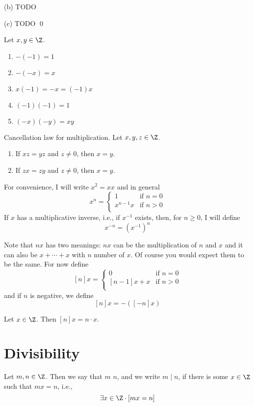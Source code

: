 (b) TODO

(c) TODO
\qed

\begin{prop}
  Let $x, y \in \Z$.
  \begin{enumerate}[nosep,label=\textnormal{(\alph*)}]
  \item $-(-1) = 1$
  \item $-(-x) = x$
  \item $x(-1) = -x = (-1)x$
  \item $(-1)(-1) = 1$
  \item $(-x)(-y) = xy$
  \end{enumerate}
\end{prop}

\begin{prop}
  Cancellation law for multiplication.
  Let $x, y, z \in \Z$.
  \begin{enumerate}[nosep,label=\textnormal{(\alph*)}]
    \item If $xz = yz$ and $z \neq 0$, then $x = y$.
    \item If $zx = zy$ and $z \neq 0$, then $x = y$.
  \end{enumerate}
\end{prop}

For convenience, I will write $x^2 = xx$ and in general
\[
x^n =
\begin{cases}
  1       &\text{if } n = 0 \\
  x^{n-1}x &\text{if } n > 0 \\
\end{cases}
\]
If $x$ has a multiplicative inverse, i.e., if $x^{-1}$ exists,
then, for $n \geq 0$, I will define
\[
x^{-n} = \left( x^{-1} \right)^n
\]

Note that $nx$ has two meanings: $nx$ can be the multiplication of $n$
and $x$ and it can also be $x + \cdots + x$ with $n$ number of $x$.
Of course you would expect them to be the same.
For now define
\[
  [n]x =
  \begin{cases}
    0       &\text{if } n = 0 \\
    [n-1]x + x &\text{if } n > 0 \\
  \end{cases}
\]
and if $n$ is negative, we define
\[
[n]x = -([-n]x)
\]

\begin{prop}
  Let $x \in \Z$.
  Then $[n]x = n \cdot x$.
\end{prop}


\newpage
\section{Divisibility}
\begin{defn}
  Let $m, n \in \Z$.
  Then we say that $m$  $n$, and we write $m \mid n$, if
  there is some $x \in \Z$ such that $mx = n$, i.e.,
  \[
    \exists x \in \Z \cdot [mx = n]
  \]
\end{defn}


